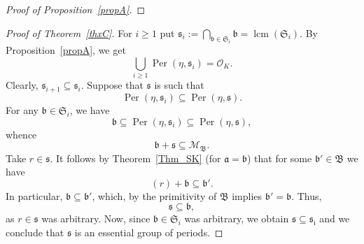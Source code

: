 \documentclass[leqno,a4paper,12pt]{article}
\DeclareMathOperator{\lcm}{lcm}
\theoremstyle{definition}
\newcommand{\Per}{\operatorname{Per}\nolimits}
\newcommand{\OK}{\mathcal{O}_K}
\newcommand{\G}{\mathbb{G}}
\newcommand{\HH}{{\mathbb{H}}}
\begin{document}
\begin{proof}[Proof of Proposition~\ref{propA}]
\end{proof}

\begin{proof}[Proof of Theorem~\ref{thxC}]
For $i\geq1$ put $\mathfrak{s}_i:=\bigcap_{\mathfrak{b}\in\mathfrak{S}_i}\mathfrak{b}=\lcm(\mathfrak{S}_i)$. By Proposition~\ref{propA}, we get \[\bigcup_{i\geq1}\Per(\eta,\mathfrak{s}_i)=\OK.\]
Clearly, $\mathfrak{s}_{i+1}\subseteq\mathfrak{s}_i$. Suppose that $\mathfrak{s}$ is such that
\[
\Per(\eta,\mathfrak{s}_i)\subseteq\Per(\eta,\mathfrak{s}).
\]
For any $\mathfrak{b}\in\mathfrak{S}_i$, we have
\[
\mathfrak{b}\subseteq \Per(\eta,\mathfrak{s}_i)\subseteq \Per(\eta,\mathfrak{s}),
\]
whence
\[
\mathfrak{b}+\mathfrak{s}\subseteq \mathcal{M}_\mathfrak{B}.
\]
Take $r\in\mathfrak{s}$. It follows by Theorem~\ref{Thm_SK} (for $\mathfrak{a}=\mathfrak{b}$) that for some $\mathfrak{b}'\in\mathfrak{B}$ we have
\[
(r)+\mathfrak{b}\subseteq \mathfrak{b}'.
\]
In particular, $\mathfrak{b}\subseteq\mathfrak{b}'$, which, by the primitivity of $\mathfrak{B}$ implies $\mathfrak{b}'=\mathfrak{b}$. Thus,
\[
\mathfrak{s}\subseteq \mathfrak{b},
\]
as $r\in\mathfrak{s}$ was arbitrary. Now, since $\mathfrak{b}\in\mathfrak{S}_i$ was arbitrary, we obtain $\mathfrak{s}\subseteq \mathfrak{s_i}$
and we conclude that $\mathfrak{s}$ is an essential group of periods.
\end{proof}
\end{document}
